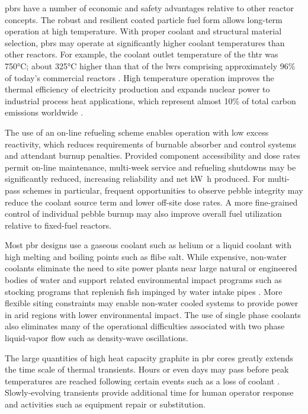 \glspl{pbr} have a number of economic and safety advantages relative to other reactor concepts. The robust and resilient coated particle fuel form allows long-term operation at high temperature. With proper coolant and structural material selection, \glspl{pbr} may operate at significantly higher coolant temperatures than other reactors. For example, the coolant outlet temperature of the \gls{thtr} was 750\si{\celsius}; about 325\si{\celsius} higher than that of the \glspl{lwr} comprising approximately 96\% of today's commercial reactors \cite{reactor_count}. High temperature operation improves the thermal efficiency of electricity production and expands nuclear power to industrial process heat applications, which represent almost 10\% of total carbon emissions worldwide \cite{friedmann}.

The use of an on-line refueling scheme enables operation with low excess reactivity, which reduces requirements of burnable absorber and control systems and attendant burnup penalties. Provided component accessibility and dose rates permit on-line maintenance, multi-week service and refueling shutdowns may be significantly reduced, increasing reliability and net \si{\kilo\watt\hour} produced. For multi-pass schemes in particular, frequent opportunities to observe pebble integrity may reduce the coolant source term and lower off-site dose rates. A more fine-grained control of individual pebble burnup may also improve overall fuel utilization relative to fixed-fuel reactors.

Most \gls{pbr} designs use a gaseous coolant such as helium or a liquid coolant with high melting and boiling points such as \gls{flibe} salt. While expensive, non-water coolants eliminate the need to site power plants near large natural or engineered bodies of water and support related environmental impact programs such as stocking programs that replenish fish impinged by water intake pipes \cite{exelon_fish}. More flexible siting constraints may enable non-water cooled systems to provide power in arid regions with lower environmental impact. The use of single phase coolants also eliminates many of the operational difficulties associated with two phase liquid-vapor flow such as density-wave oscillations.

The large quantities of high heat capacity graphite in \gls{pbr} cores greatly extends the time scale of thermal transients. Hours or even days may pass before peak temperatures are reached following certain events such as a loss of coolant \cite{htrpm,tyobeka}. Slowly-evolving transients provide additional time for human operator response and activities such as equipment repair or substitution.

